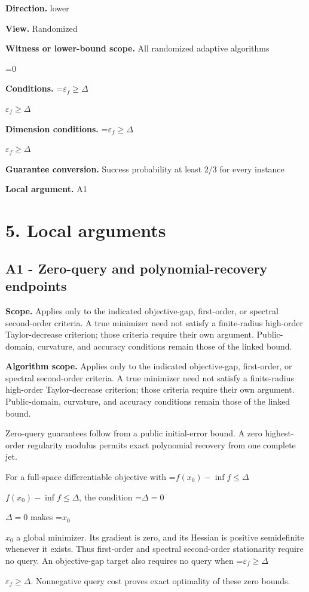 \documentclass[10pt,a4paper]{article}
\newcommand{\AtlasMath}[1]{\par\begingroup\centering\setbox0=\hbox{$\displaystyle #1$}\ifdim\wd0>1.4\linewidth\typeout{ATLAS WIDE FORMULA: \the\wd0}\fi\ifdim\wd0>\linewidth\resizebox{\linewidth}{!}{\box0}\else\box0\fi\par\endgroup}
\newcommand{\AtlasInlineMath}[1]{\begingroup\setbox0=\hbox{$#1$}\ifdim\wd0>.4\linewidth\endgroup\AtlasMath{#1}\else\endgroup$#1$\fi}
\begin{document}
\textbf{Direction.} lower

\textbf{View.} Randomized

\textbf{Witness or lower-bound scope.} All randomized adaptive algorithms

\AtlasMath{0}
\textbf{Conditions.} \AtlasInlineMath{\varepsilon_f\ge \Delta}

\textbf{Dimension conditions.} \AtlasInlineMath{\varepsilon_f\ge \Delta}

\textbf{Guarantee conversion.} Success probability at least 2/3 for every instance

\textbf{Local argument.} A1

\section{5. Local arguments}
\subsection{A1 - Zero-query and polynomial-recovery endpoints}
\textbf{Scope.} Applies only to the indicated objective-gap, first-order, or spectral second-order criteria. A true minimizer need not satisfy a finite-radius high-order Taylor-decrease criterion; those criteria require their own argument. Public-domain, curvature, and accuracy conditions remain those of the linked bound.

\textbf{Algorithm scope.} Applies only to the indicated objective-gap, first-order, or spectral second-order criteria. A true minimizer need not satisfy a finite-radius high-order Taylor-decrease criterion; those criteria require their own argument. Public-domain, curvature, and accuracy conditions remain those of the linked bound.

Zero-query guarantees follow from a public initial-error bound. A zero highest-order regularity modulus permits exact polynomial recovery from one complete jet.

For a full-space differentiable objective with \AtlasInlineMath{f(x_0)-\inf f\le\Delta}, the condition \AtlasInlineMath{\Delta=0} makes \AtlasInlineMath{x_0} a global minimizer. Its gradient is zero, and its Hessian is positive semidefinite whenever it exists. Thus first-order and spectral second-order stationarity require no query. An objective-gap target also requires no query when \AtlasInlineMath{\varepsilon_f\ge\Delta}. Nonnegative query cost proves exact optimality of these zero bounds.
\end{document}
